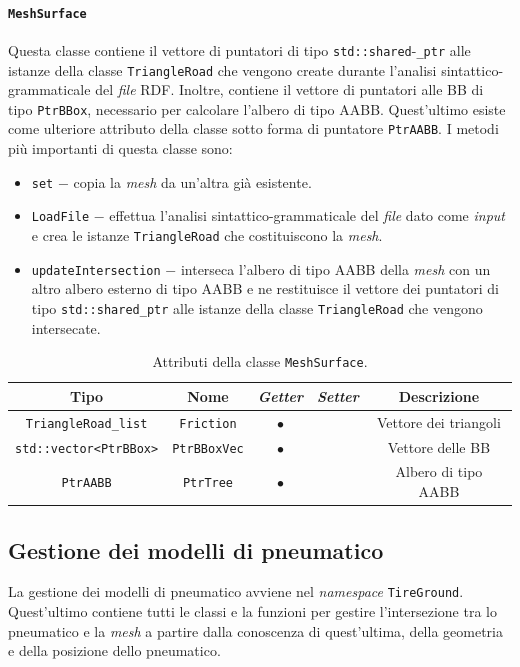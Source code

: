 \paragraph{\texttt{MeshSurface}}
Questa classe contiene il vettore di puntatori di tipo \texttt{std::shared}-\texttt{\_ptr} alle istanze della classe \texttt{TriangleRoad} che vengono create durante l'analisi sintattico-grammaticale del \textit{file} \ac{RDF}. Inoltre, contiene il vettore di puntatori alle \ac{BB} di tipo \texttt{PtrBBox}, necessario per calcolare l'albero di tipo \ac{AABB}. Quest'ultimo esiste come ulteriore attributo della classe sotto forma di puntatore \texttt{PtrAABB}. I metodi più importanti di questa classe sono:
\begin{itemize}
	\item \texttt{set} $-$ copia la \textit{mesh} da un'altra già esistente.
	\item \texttt{LoadFile} $-$ effettua l'analisi sintattico-grammaticale del \textit{file} dato come \textit{input} e crea le istanze \texttt{TriangleRoad} che costituiscono la \textit{mesh}.
	\item \texttt{updateIntersection} $-$ interseca l'albero di tipo \ac{AABB} della \textit{mesh} con un altro albero esterno di tipo \ac{AABB} e ne restituisce il vettore dei puntatori di tipo \texttt{std::shared\_ptr} alle istanze della classe \texttt{TriangleRoad} che vengono intersecate.
\end{itemize}
\begin{table}[h!]
	\centering
	\begin{tabular}{|c|c|c|c|c|}
		\hline 
		\textbf{Tipo} & \textbf{Nome} & \textit{\textbf{Getter}} & \textit{\textbf{Setter}} & \textbf{Descrizione} \\ \hline 
		\texttt{TriangleRoad\_list} & \texttt{Friction} & $\bullet$ & & Vettore dei triangoli \\ \hline
		\texttt{std::vector<PtrBBox>} & \texttt{PtrBBoxVec} & $\bullet$ & & Vettore delle \ac{BB} \\ \hline
		\texttt{PtrAABB} & \texttt{PtrTree} & $\bullet$ & & Albero di tipo \ac{AABB} \\ \hline
	\end{tabular}
	\caption{Attributi della classe \texttt{MeshSurface}.}
\end{table}
%
\subsection{Gestione dei modelli di pneumatico} 
La gestione dei modelli di pneumatico avviene nel \textit{namespace} \texttt{TireGround}. Quest'ultimo contiene tutti le classi e la funzioni per gestire l'intersezione tra lo pneumatico e la \textit{mesh} a partire dalla conoscenza di quest'ultima, della geometria e della posizione dello pneumatico.
%
